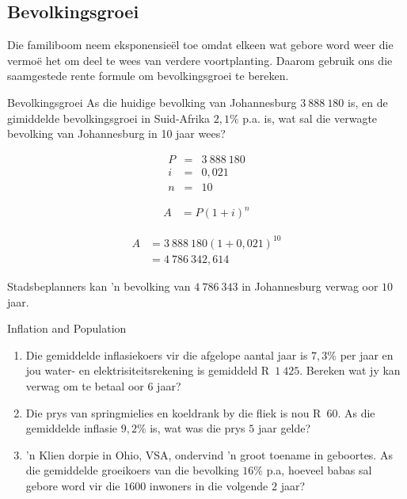 \subsection{Bevolkingsgroei}

 Die familiboom neem eksponensie\"el toe omdat elkeen wat gebore word weer die vermo\"e het om deel te wees van verdere voortplanting. Daarom gebruik ons die saamgestede rente formule om bevolkingsgroei te bereken.


\begin{wex}{Bevolkingsgroei}
    {As die huidige bevolking van Johannesburg $3~888~180$ is, en de gimiddelde bevolkingsgroei in Suid-Afrika $2,1\%$ p.a. is, wat sal die verwagte bevolking van Johannesburg in 10 jaar wees?}{
    
    \begin{eqnarray*}
	P &=& 3~888~180\\
	i &=& 0,021\\
	n &=& 10
    \end{eqnarray*}

    \begin{align*}
	A &= P(1 + i)^n
    \end{align*}

    \begin{align*}
	A &= 3~888~180(1 + 0,021)^{10}\\
	  &= 4~786~342,614
    \end{align*}

    Stadsbeplanners kan 'n bevolking van $4~786~343$ in Johannesburg verwag oor $10$ jaar.
    }
\end{wex}


\begin{exercises}{Inflation and Population}
{
    \begin{enumerate}[label=\textbf{\arabic*}.]
	\item Die gemiddelde inflasiekoers vir die afgelope aantal jaar is $7,3\%$ per jaar en jou water- en elektrisiteitsrekening is gemiddeld R~$1~425$. Bereken wat jy kan verwag om te betaal oor 6 jaar?

	\item Die prys van springmielies en koeldrank by die fliek is nou R~$60$. As die gemiddelde inflasie $9,2\%$ is, wat was die prys $5$ jaar gelde?

	\item 'n Klien dorpie in Ohio, VSA, ondervind 'n groot toename in geboortes. As die gemiddelde groeikoers van die bevolking $16\%$ p.a, hoeveel babas sal gebore word vir die $1600$ inwoners in die volgende $2$ jaar?
    \end{enumerate}

}
\end{exercises}



